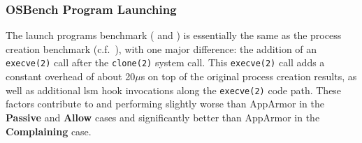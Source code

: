 


\subsubsection{OSBench Program Launching}

The launch programs benchmark ( and ) is essentially the
same as the process creation benchmark (c.f.\ ), with one
major difference: the addition of an \texttt{execve(2)} call after the \texttt{clone(2)}
system call. This \texttt{execve(2)} call adds a constant overhead of about 20$\mu$s on
top of the original process creation results, as well as additional \gls{lsm} hook
invocations along the \texttt{execve(2)} code path. These factors contribute to \bpfbox{}
and \bpfcontain{} performing slightly worse than AppArmor in the \textbf{Passive} and
\textbf{Allow} cases and significantly better than AppArmor in the \textbf{Complaining}
case.

